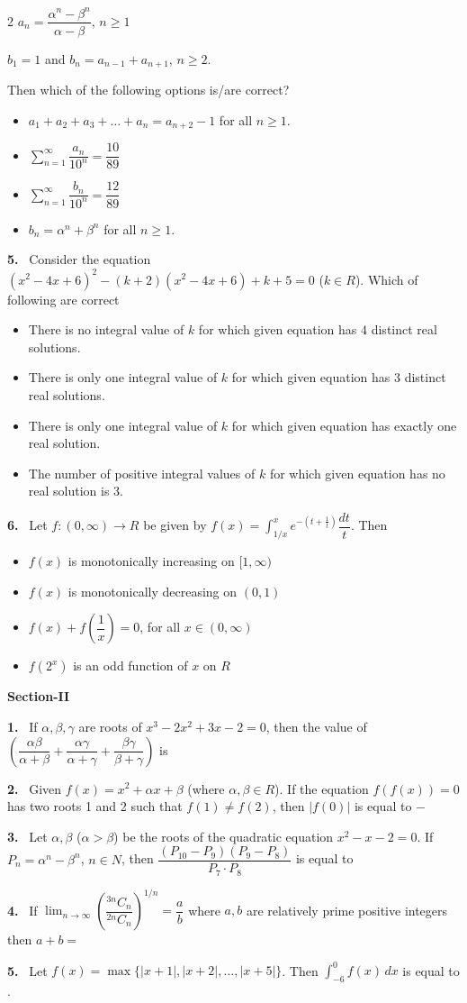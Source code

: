 \documentclass[10pt]{extarticle}
\newcommand{\sect}[1]{\par\smallskip\noindent\textbf{#1}\par}
\newcommand{\qn}[1]{\par\smallskip\noindent\textbf{#1.}~}
\newenvironment{qoptions}{\begin{itemize}[leftmargin=1.8em,itemsep=1pt,topsep=2pt,label={}]}{\end{itemize}}
\newcommand{\opt}[2]{\item[(#1)] #2}
\begin{document}
\begin{multicols}{2}
$a_n=\dfrac{\alpha^n-\beta^n}{\alpha-\beta}$, $n\ge1$\par
$b_1=1$ and $b_n=a_{n-1}+a_{n+1}$, $n\ge2$.\par
Then which of the following options is/are correct?
\begin{qoptions}
\opt{A}{$a_1+a_2+a_3+\ldots+a_n=a_{n+2}-1$ for all $n\ge1$.}
\opt{B}{$\displaystyle\sum_{n=1}^{\infty}\dfrac{a_n}{10^n}=\dfrac{10}{89}$}
\opt{C}{$\displaystyle\sum_{n=1}^{\infty}\dfrac{b_n}{10^n}=\dfrac{12}{89}$}
\opt{D}{$b_n=\alpha^n+\beta^n$ for all $n\ge1$.}
\end{qoptions}
\qn{5} Consider the equation $(x^2-4x+6)^2-(k+2)(x^2-4x+6)+k+5=0$ ($k\in R$). Which of following are correct
\begin{qoptions}
\opt{A}{There is no integral value of $k$ for which given equation has 4 distinct real solutions.}
\opt{B}{There is only one integral value of $k$ for which given equation has 3 distinct real solutions.}
\opt{C}{There is only one integral value of $k$ for which given equation has exactly one real solution.}
\opt{D}{The number of positive integral values of $k$ for which given equation has no real solution is 3.}
\end{qoptions}
\qn{6} Let $f:(0,\infty)\to R$ be given by $f(x)=\displaystyle\int_{1/x}^{x}e^{-\left(t+\frac1t\right)}\dfrac{dt}{t}$. Then
\begin{qoptions}
\opt{A}{$f(x)$ is monotonically increasing on $[1,\infty)$}
\opt{B}{$f(x)$ is monotonically decreasing on $(0,1)$}
\opt{C}{$f(x)+f\!\left(\dfrac1x\right)=0$, for all $x\in(0,\infty)$}
\opt{D}{$f(2^x)$ is an odd function of $x$ on $R$}
\end{qoptions}
\sect{Section-II}
\qn{1} If $\alpha,\beta,\gamma$ are roots of $x^3-2x^2+3x-2=0$, then the value of $\left(\dfrac{\alpha\beta}{\alpha+\beta}+\dfrac{\alpha\gamma}{\alpha+\gamma}+\dfrac{\beta\gamma}{\beta+\gamma}\right)$ is
\qn{2} Given $f(x)=x^2+\alpha x+\beta$ (where $\alpha,\beta\in R$). If the equation $f(f(x))=0$ has two roots 1 and 2 such that $f(1)\neq f(2)$, then $|f(0)|$ is equal to $-$
\qn{3} Let $\alpha,\beta$ ($\alpha>\beta$) be the roots of the quadratic equation $x^2-x-2=0$. If $P_n=\alpha^n-\beta^n$, $n\in N$, then $\dfrac{(P_{10}-P_9)(P_9-P_8)}{P_7\cdot P_8}$ is equal to
\qn{4} If $\displaystyle\lim_{n\to\infty}\left(\dfrac{{}^{3n}C_n}{{}^{2n}C_n}\right)^{1/n}=\dfrac ab$ where $a,b$ are relatively prime positive integers then $a+b=$
\qn{5} Let $f(x)=\max\{|x+1|,|x+2|,\ldots,|x+5|\}$. Then $\displaystyle\int_{-6}^{0}f(x)\,dx$ is equal to \underline{\hspace{4em}}.

\end{multicols}
\end{document}

